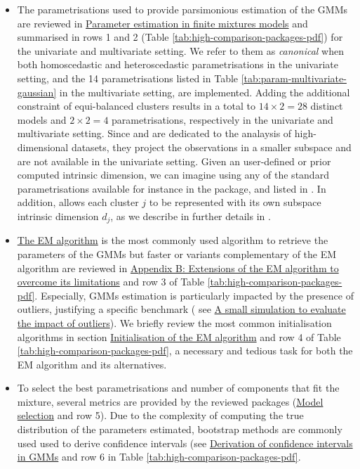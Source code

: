 \begin{itemize}
\item
  The parametrisations used to provide parsimonious estimation of the GMMs are reviewed in \protect\hyperlink{parameter-estimation-in-finite-mixtures-models}{Parameter estimation in finite mixtures models} and summarised in rows 1 and 2 (Table \ref{tab:high-comparison-packages-pdf}) for the univariate and multivariate setting. We refer to them as \emph{canonical} when both homoscedastic and heteroscedastic parametrisations in the univariate setting, and the 14 parametrisations listed in Table \ref{tab:param-multivariate-gaussian} in the multivariate setting, are implemented. Adding the additional constraint of equi-balanced clusters results in a total to \(14 \times 2=28\) distinct models and \(2 \times 2=4\) parametrisations, respectively in the univariate and multivariate setting. \color{blue}Since  and  are dedicated to the analaysis of high-dimensional datasets, they project the observations in a smaller subspace and are not available in the univariate setting. Given an user-defined or prior computed intrinsic dimension, we can imagine using any of the standard parametrisations available for instance in the  package, and listed in . In addition,  allows each cluster \(j\) to be represented with its own subspace intrinsic dimension \(d_j\), as we describe in further details in . \color{black}
\item
  \protect\hyperlink{the-em-algorithm}{The EM algorithm} is the most commonly used
  algorithm to retrieve the parameters of the GMMs but faster or variants complementary of the EM algorithm are reviewed in \protect\hyperlink{appendix-b-extensions-of-the-em-algorithm-to-overcome-its-limitations}{Appendix B: Extensions of the EM algorithm to overcome its limitations} and row 3 of Table \ref{tab:high-comparison-packages-pdf}. Especially, GMMs estimation is particularly impacted by the presence of outliers, justifying a specific benchmark ( see \protect\hyperlink{a-small-simulation-to-evaluate-the-impact-of-outliers}{A small simulation to evaluate the impact of outliers}).
  We briefly review the most common initialisation algorithms in section \protect\hyperlink{initialisation-of-the-em-algorithm}{Initialisation of the EM algorithm} and row 4 of Table \ref{tab:high-comparison-packages-pdf}, a necessary and tedious task for both the EM algorithm and its alternatives.
\item
  To select the best parametrisations and number of components that fit the mixture, several metrics are provided by the reviewed packages
  (\protect\hyperlink{model-selection}{Model selection} and row 5). Due to the complexity of computing the true distribution of the parameters estimated, bootstrap methods are commonly used used to derive confidence intervals (see \protect\hyperlink{derivation-of-confidence-intervals-in-gmms}{Derivation of
  confidence intervals in GMMs} and row 6 in Table \ref{tab:high-comparison-packages-pdf}.
\end{itemize}


